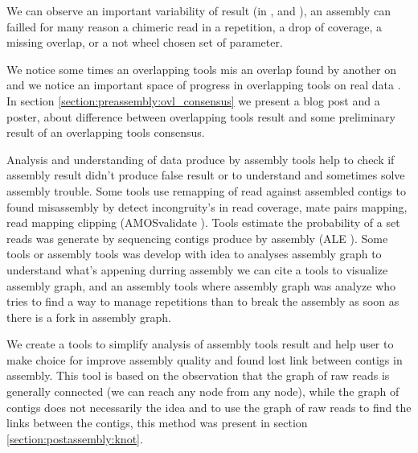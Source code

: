 \documentclass[./main.tex]{subfiles}
\begin{document}
We can observe an important variability of result (in \canu, \wtdbg and ), an assembly can failled for many reason a chimeric read in a repetition, a drop of coverage, a missing overlap, or a not wheel chosen set of parameter.

We notice some times an overlapping tools mis an overlap found by another on and we notice an important space of progress in overlapping tools on real data \cite{ovl_bench}. In section \ref{section:preassembly:ovl_consensus} we present a blog post and a poster, about difference between overlapping tools result and some preliminary result of an overlapping tools consensus.


Analysis and understanding of data produce by assembly tools help to check if assembly result didn't produce false result or to understand and sometimes solve assembly trouble. Some tools use remapping of read against assembled contigs to found misassembly by detect incongruity's in read coverage, mate pairs mapping, read mapping clipping (AMOSvalidate \cite{amosvalidate}).
Tools estimate the probability of a set reads was generate by sequencing contigs produce by assembly (ALE \cite{ALE}). 
Some tools or assembly tools was develop with idea to analyses assembly graph to understand what's appening durring assembly we can cite  \cite{paper/} a tools to visualize assembly graph, and \hinge \cite{hinge} an assembly tools where assembly graph was analyze who tries to find a way to manage repetitions than to break the assembly as soon as there is a fork in assembly graph.

We create \knot a tools to simplify analysis of assembly tools result and help user to make choice for improve assembly quality and found lost link between contigs in assembly. This tool is based on the observation that the graph of raw reads is generally connected (we can reach any node from any node), while the graph of contigs does not necessarily the idea and to use the graph of raw reads to find the links between the contigs, this method was present in section \ref{section:postassembly:knot}.

\end{document}

